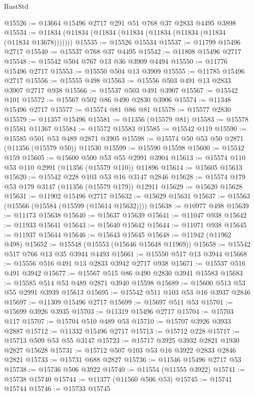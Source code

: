 \begin{lexlean}{RustStd}
\begin{coremodule}
@15526 := @13664 @15496 @2717 @291 @51 @768 @37 @2833 @4495 @3898
@15534 := @11834 (@11834 (@11834 (@11834 (@11834 (@11834 (@11834 (@11834 @13678)))))))
@15535 := @15526 @15534
@15537 := @11799 @15496 @2717
@15540 := @15537 @768 @37 @4495
@15542 := @11808 @15496 @2717
@15548 := @15542 @504 @767 @13 @36 @3909 @4494
@15550 := @11776 @15496 @2717
@15553 := @15550 @504 @13 @3909
@15555 := @11785 @15496 @2717
@15556 := @15555 @498
@15563 := @15556 @503 @491 @13 @2833 @3907 @2717 @938
@15566 := @15537 @503 @491 @3907
@15567 := @15542 @101
@15572 := @15567 @502 @86 @490 @2830 @3906
@15574 := @11348 @15496 @2717
@15577 := @15574 @81 @86 @81
@15578 := @15577 @2830
@15579 := @11357 @15496
@15581 := @11356 (@15579 @81)
@15583 := @15578 @15581 @11367
@15584 := @15572 @15583
@15585 := @15542 @119
@15590 := @15585 @501 @53 @489 @2871 @3905
@15598 := @15574 @50 @53 @50 @2871 (@11356 (@15579 @50)) @11530
@15599 := @15590 @15598
@15600 := @15542 @159
@15605 := @15600 @500 @53 @55 @2991 @3904
@15613 := @15574 @110 @53 @110 @2991 (@11356 (@15579 @110)) @11896
@15614 := @15605 @15613
@15620 := @15542 @228 @103 @53 @16 @3147 @2846
@15628 := @15574 @179 @53 @179 @3147 (@11356 (@15579 @179)) @12911
@15629 := @15620 @15628
@15631 := @11902 @15496 @2717
@15632 := @15629 @15631
@15637 := @15563 (@15566 (@15584 (@15599 (@15614 @15632))))
@15638 := @10977 @498
@15639 := @11173 @15638
@15640 := @15637 @15639
@15641 := @11047 @938
@15642 := @11933 @15641
@15643 := @15640 @15642
@15644 := @11071 @938
@15645 := @11937 @15644
@15646 := @15643 @15645
@15648 := @11942 (@11962 @498)
@15652 := @15548 (@15553 (@15646 @15648 @11969))
@15658 := @15542 @517 @766 @13 @35 @3944 @4493
@15661 := @15550 @517 @13 @3944
@15668 := @15556 @516 @491 @13 @2833 @3942 @2717 @938
@15671 := @15537 @516 @491 @3942
@15677 := @15567 @515 @86 @490 @2830 @3941 @15583
@15683 := @15585 @514 @53 @489 @2871 @3940 @15598
@15689 := @15600 @513 @53 @55 @2991 @3939 @15613
@15695 := @15542 @511 @103 @53 @16 @3937 @2846
@15697 := @11309 @15496 @2717
@15699 := @15697 @511 @53
@15701 := @15699 @3926 @3935
@15703 := @11319 @15496 @2717
@15704 := @15703 @117
@15707 := @15704 @510 @489 @53
@15710 := @15707 @3926 @3933 @2887
@15712 := @11332 @15496 @2717
@15713 := @15712 @228
@15717 := @15713 @509 @53 @55 @3147
@15723 := @15717 @3925 @3932 @2821 @1930 @2827 @15628
@15731 := @15712 @507 @103 @53 @16 @3922 @2833 @2846 @2821
@15733 := @15731 @688 @2827
@15736 := @11546 @15496 @2717 @53
@15738 := @15736 @506 @3922
@15740 := @11554 (@11555 @3922)
@15741 := @15738 @15740
@15744 := @11377 (@11560 @506 @53)
@15745 := @15741 @15744
@15746 := @15733 @15745

\end{coremodule}
\end{lexlean}
